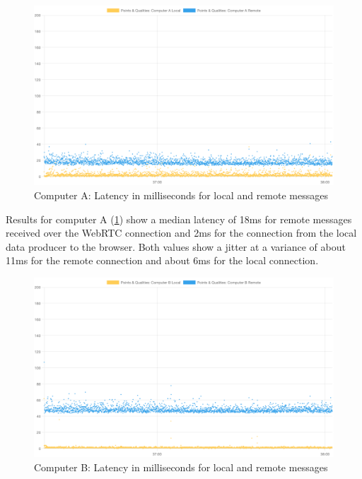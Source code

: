 \begin{figure}[h]
\centering
\includegraphics[scale=0.4]{04_Artefakte/01_Abbildungen/latency-computer-a}
\caption[Message latency on Computer A]{Computer A: Latency in milliseconds for local and remote messages\protect}
\label{fig:latencyComputerA}
\end{figure}

Results for computer A (\ref{fig:latencyComputerA}) show a median latency of 18ms for remote messages received over the WebRTC connection and 2ms for the connection from the local data producer to the browser.
Both values show a jitter at a variance of about 11ms for the remote connection and about 6ms for the local connection.

\begin{figure}[h]
\centering
\includegraphics[scale=0.4]{04_Artefakte/01_Abbildungen/latency-computer-b}
\caption[Message latency on Computer B]{Computer B: Latency in milliseconds for local and remote messages\protect}
\label{fig:latencyComputerB}
\end{figure}

